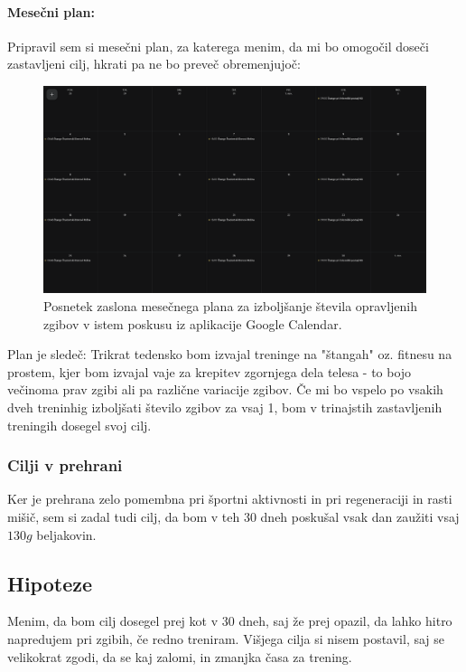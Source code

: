 \documentclass{article}
\begin{document}
\paragraph{Mesečni plan:}
Pripravil sem si mesečni plan, za katerega menim, da mi bo omogočil doseči zastavljeni cilj, hkrati pa ne bo preveč obremenjujoč:

\begin{figure}[H]
    \centering
    \includegraphics[width=1\textwidth]{figures/Stange-mesecni-plan.png}
    \caption{Posnetek zaslona mesečnega plana za izboljšanje števila opravljenih zgibov v istem poskusu iz aplikacije Google Calendar.} 
    \label{fig:mesecni-plan}
\end{figure}

Plan je sledeč: Trikrat tedensko bom izvajal treninge na "štangah" oz. fitnesu na prostem, kjer bom izvajal vaje za krepitev zgornjega dela telesa - to bojo večinoma prav zgibi ali pa različne variacije zgibov. Če mi bo vspelo po vsakih dveh treninhig izboljšati število zgibov za vsaj 1, bom v trinajstih zastavljenih treningih dosegel svoj cilj.

\subsubsection{Cilji v prehrani}
Ker je prehrana zelo pomembna pri športni aktivnosti in pri regeneraciji in rasti mišič, sem si zadal tudi cilj, da bom v teh 30 dneh poskušal vsak dan zaužiti vsaj $130g$ beljakovin.

\subsection{Hipoteze}

Menim, da bom cilj dosegel prej kot v 30 dneh, saj že prej opazil, da lahko hitro napredujem pri zgibih, če redno treniram. Višjega cilja si nisem postavil, saj se velikokrat zgodi, da se kaj zalomi, in zmanjka časa za trening.
\end{document}
